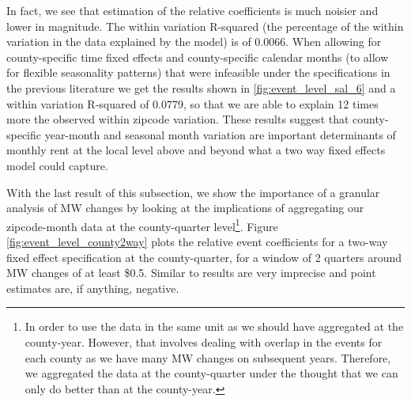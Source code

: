 In fact, we see that estimation of the relative coefficients is much noisier and lower in magnitude. The within variation R-squared (the percentage of the within variation in the data explained by the model) is of 0.0066. When allowing for county-specific time fixed effects and county-specific calendar months (to allow for flexible seasonality patterns) that were infeasible under the specifications in the previous literature we get the results shown in \ref{fig:event_level_sal_6} and a within variation R-squared of 0.0779, so that we are able to explain 12 times more the observed within zipcode variation. These results suggest that county-specific year-month and seasonal month variation are important determinants of monthly rent at the local level above and beyond what a two way fixed effects model could capture.

With the last result of this subsection, we show the importance of a granular analysis of MW changes by looking at the implications of aggregating our zipcode-month data at the county-quarter level\footnote{In order to use the data in the same unit as \textcite{tidemann2018mw,yamagishi2019minimum} we should have aggregated at the county-year. However, that involves dealing with overlap in the events for each county as we have many MW changes on subsequent years. Therefore, we aggregated the data at the county-quarter under the thought that we can only do better than at the county-year.}. Figure \ref{fig:event_level_county2way} plots the relative event coefficients for a two-way fixed effect specification at the county-quarter, for a window of 2 quarters around MW changes of at least \$0.5. Similar to \textcite{tidemann2018mw} results are very imprecise and point estimates are, if anything, negative. 

